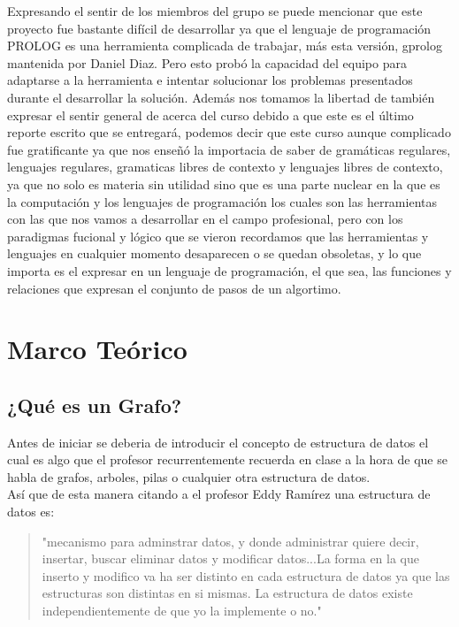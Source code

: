 \documentclass[10pt,a4paper]{article}
\begin{document}
	Expresando el sentir de los miembros del grupo se puede mencionar que este proyecto fue bastante difícil de desarrollar ya que el lenguaje de programación PROLOG es una herramienta complicada de trabajar, más esta versión, gprolog mantenida por Daniel Diaz. Pero esto probó la capacidad del equipo para adaptarse a la herramienta e intentar solucionar los problemas presentados durante el desarrollar la solución. Además nos tomamos la libertad de también  expresar el sentir general de acerca del curso debido a que este es el último reporte escrito que se entregará, podemos decir que este curso aunque complicado fue gratificante ya que nos enseñó la importacia de saber de gramáticas regulares, lenguajes regulares, gramaticas libres de contexto y lenguajes libres de contexto, ya que no solo es materia sin utilidad sino que es una parte nuclear en la que es la computación y los lenguajes de programación los cuales son las herramientas con las que nos vamos a desarrollar en el campo profesional, pero con los paradigmas fucional y lógico que se vieron recordamos que las herramientas y lenguajes en cualquier momento desaparecen o se quedan obsoletas, y lo que importa es el expresar en un lenguaje de programación, el que sea,  las funciones y relaciones que expresan el conjunto de pasos de un algortimo.    			 
\pagebreak
\section{Marco Teórico}
\subsection{¿Qué es un Grafo?}
	Antes de iniciar se deberia de introducir el concepto de estructura de datos el cual es algo que el profesor recurrentemente recuerda en clase a la hora de que se habla de grafos, arboles, pilas o cualquier otra estructura de datos.\\
	Así que de esta manera citando a el profesor Eddy Ramírez una estructura de datos es:\\
	 \begin{quotation}
	 "mecanismo para adminstrar datos, y donde administrar quiere decir, insertar, buscar eliminar datos y modificar datos...La forma en la que inserto y modifico va ha ser distinto en cada estructura de datos ya que las estructuras son distintas en si mismas. La estructura de datos existe independientemente de que yo la implemente o no." \cite{Eddy}\\
	 \end{quotation}
	
\end{document}
